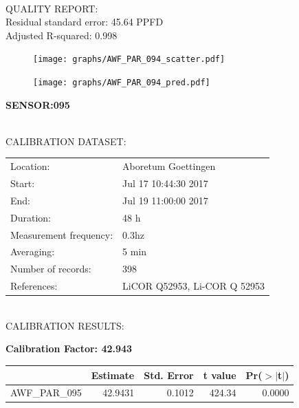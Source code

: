 \documentclass[oneside]{report}
\begin{document}
\hrulefill\\
QUALITY REPORT:\\
Residual standard error: 45.64 PPFD\\
Adjusted R-squared: 0.998



\begin{figure}[H]
  \centering
  \texttt{[image: graphs/AWF\_PAR\_094\_scatter.pdf]}
\end{figure}




\begin{figure}[H]
  \centering
  \texttt{[image: graphs/AWF\_PAR\_094\_pred.pdf]}
\end{figure}

\pagebreak


\begin{center}
\large{\textbf{SENSOR:095}}\\
\end{center}

\hrulefill\\
CALIBRATION DATASET:\\
\begin{table}[h!]
  \centering
  \label{tab:table1}
  \begin{tabular}{ll}
    Location: & Aboretum Goettingen\\ 
    
    
    Start:  & Jul 17 10:44:30 2017 \\
    End:   & Jul 19 11:00:00 2017\\ 
    Duration: & 48 h\\
    Measurement frequency: & 0.3hz\\
    Averaging:  &5 min\\
    Number of records: & 398 \\
    References: & LiCOR Q52953, Li-COR Q 52953 \\
  \end{tabular}
\end{table}

\hrulefill\\
CALIBRATION RESULTS:\\


\begin{center}
\textbf{\large{Calibration Factor: 42.943}}\\
\end{center}
\begin{table}[ht]
\centering
\begin{tabular}{rrrrr}
  \hline
 & Estimate & Std. Error & t value & Pr($>$$|$t$|$) \\ 
  \hline
AWF\_PAR\_095 & 42.9431 & 0.1012 & 424.34 & 0.0000 \\ 
   \hline
\end{tabular}
\end{table}
\end{document}
